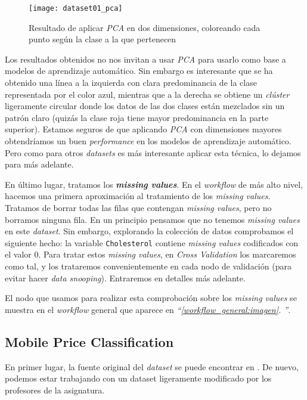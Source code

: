 \documentclass[11pt]{article}
\newcommand{\customcite}[1]{\emph{``\ref{#1}. \nameref{#1}''}}
\begin{document}
\begin{figure}[H]
    \centering
    \texttt{[image: dataset01\_pca]}
    \caption{Resultado de aplicar \emph{PCA} en dos dimensiones, coloreando cada punto según la clase a la que pertenecen}
\end{figure}

Los resultados obtenidos no nos invitan a usar \emph{PCA} para usarlo como base a modelos de aprendizaje automático. Sin embargo es interesante que se ha obtenido una línea a la izquierda con clara predominancia de la clase representada por el color azul, mientras que a la derecha se obtiene un \emph{clúster} ligeramente circular donde los datos de las dos clases están mezclados sin un patrón claro (quizás la clase roja tiene mayor predominancia en la parte superior). Estamos seguros de que aplicando \emph{PCA} con dimensiones mayores obtendríamos un buen \emph{performance} en los modelos de aprendizaje automático. Pero como para otros \emph{datasets} es más interesante aplicar esta técnica, lo dejamos para más adelante.

En último lugar, tratamos los \textbf{\emph{missing values}}. En el \emph{workflow} de más alto nivel, hacemos una primera aproximación al tratamiento de los \emph{missing values}. Tratamos de borrar todas las filas que contengan \emph{missing values}, pero no borramos ninguna fila. En un principio pensamos que no tenemos \emph{missing values} en este \emph{dataset}. Sin embargo, explorando la colección de datos comprobamos el siguiente hecho: la variable \lstinline{Cholesterol} contiene \emph{missing values} codificados con el valor $0$. Para tratar estos \emph{missing values}, en \emph{Cross Validation} los marcaremos como tal, y los trataremos convenientemente en cada nodo de validación (para evitar hacer \emph{data snooping}). Entraremos en detalles más adelante.

El nodo que usamos para realizar esta comprobación sobre los \emph{missing values} se muestra en el \emph{workflow} general que aparece en \customcite{workflow_general:imagen}.

\pagebreak

\subsection{Mobile Price Classification}

En primer lugar, la fuente original del \emph{dataset} se puede encontrar en \cite{mobile_dataset:online}. De nuevo, podemos estar trabajando con un dataset ligeramente modificado por los profesores de la asignatura.
\end{document}
